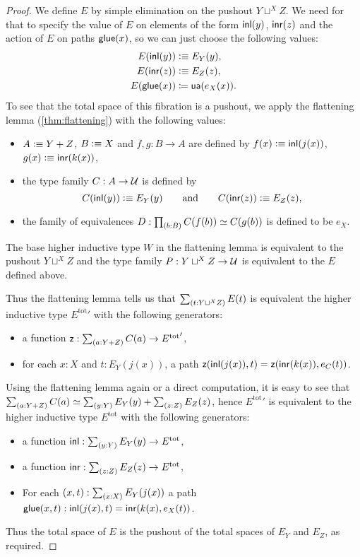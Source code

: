 \begin{proof}
  We define $E$ by simple elimination on the pushout $Y\sqcup^XZ$. We need for
  that to specify the value of $E$ on elements of the form ${\mathsf{inl}}(y)$, ${\mathsf{inr}}(z)$
  and the action of $E$ on paths $\mathsf{glue}(x)$, so we can just choose the following
  values:
  \begin{align*}
    E({\mathsf{inl}}(y)) & \vcentcolon\equiv E_Y(y),\\
    E({\mathsf{inr}}(z)) & \vcentcolon\equiv E_Z(z),\\
    {E}\mathopen{}\left({\mathsf{glue}(x)}\right)\mathclose{} & \coloneqq \mathsf{ua}(e_X(x)).
  \end{align*}
  To see that the total space of this fibration is a pushout, we apply the
  flattening lemma (\autoref{thm:flattening}) with the following values:
  \begin{itemize}
  \item $A\vcentcolon\equiv Y+Z$, $B\vcentcolon\equiv X$ and $f,g:B\to A$ are defined by
    $f(x)\vcentcolon\equiv{\mathsf{inl}}(j(x))$, $g(x)\vcentcolon\equiv{\mathsf{inr}}(k(x))$,
  \item the type family $C:A\to\mathcal{U}$ is defined by
    \begin{equation*}
      C({\mathsf{inl}}(y)) \vcentcolon\equiv E_Y(y)
      \qquad\text{and}\qquad
      C({\mathsf{inr}}(z)) \vcentcolon\equiv E_Z(z),
    \end{equation*}
  \item the family of equivalences $D:\prd{b:B}C(f(b))\simeq C(g(b))$ is defined
    to be $e_X$.
  \end{itemize}
  The base higher inductive type $W$ in the flattening lemma is equivalent to
  the pushout $Y\sqcup^XZ$ and the type family $P:Y\sqcup^XZ\to\mathcal{U}$ is
  equivalent to the $E$ defined above.

  Thus the flattening lemma tells us that $\sm{t:Y\sqcup^XZ}E(t)$ is equivalent
  the higher inductive type ${E^{\mathrm{tot}}}'$ with the following generators:
  \begin{itemize}
  \item a function $\mathsf{z}:\sm{a:Y+Z}C(a)\to {E^{\mathrm{tot}}}'$,
  \item for each $x:X$ and $t:E_Y(j(x))$, a path
    $\mathsf{z}({\mathsf{inl}}(j(x)),t)=\mathsf{z}({\mathsf{inr}}(k(x)),e_C(t))$.
  \end{itemize}
  Using the flattening lemma again or a direct computation, it is easy to see
  that $\eqv{\sm{a:Y+Z}C(a)}{\sm{y:Y}E_Y(y)+\sm{z:Z}E_Z(z)}$, hence
  ${E^{\mathrm{tot}}}'$ is equivalent to the higher inductive type
  $E^{\mathrm{tot}}$ with the following generators:
  \begin{itemize}
  \item a function $\inl:\sm{y:Y}E_Y(y)\to E^{\mathrm{tot}}$,
  \item a function $\inr:\sm{z:Z}E_Z(z)\to E^{\mathrm{tot}}$,
  \item For each $(x,t):\sm{x:X}E_Y(j(x))$ a path $\mathsf{glue}(x,t):{\mathsf{inl}}(j(x),t) =
    {\mathsf{inr}}(k(x),e_X(t))$.
  \end{itemize}
  Thus the total space of $E$ is the pushout of the total spaces of
  $E_Y$ and $E_Z$, as required.
\end{proof}


